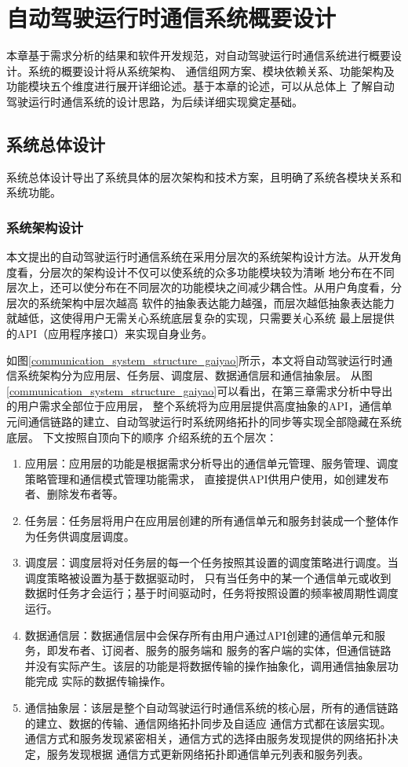 \chapter{自动驾驶运行时通信系统概要设计}
本章基于需求分析的结果和软件开发规范，对自动驾驶运行时通信系统进行概要设计。系统的概要设计将从系统架构、
通信组网方案、模块依赖关系、功能架构及功能模块五个维度进行展开详细论述。基于本章的论述，可以从总体上
了解自动驾驶运行时通信系统的设计思路，为后续详细实现奠定基础。

\section{系统总体设计}
系统总体设计导出了系统具体的层次架构和技术方案，且明确了系统各模块关系和系统功能。
\subsection{系统架构设计}
本文提出的自动驾驶运行时通信系统在采用分层次的系统架构设计方法。从开发角度看，分层次的架构设计不仅可以使系统的众多功能模块较为清晰
地分布在不同层次上，还可以使分布在不同层次的功能模块之间减少耦合性。从用户角度看，分层次的系统架构中层次越高
软件的抽象表达能力越强，而层次越低抽象表达能力就越低，这使得用户无需关心系统底层复杂的实现，只需要关心系统
最上层提供的API（应用程序接口）来实现自身业务。

如图\ref{communication_system_structure_gaiyao}所示，本文将自动驾驶运行时通信系统架构分为应用层、任务层、调度层、数据通信层和通信抽象层。
从图\ref{communication_system_structure_gaiyao}可以看出，在第三章需求分析中导出的用户需求全部位于应用层，
整个系统将为应用层提供高度抽象的API，通信单元间通信链路的建立、自动驾驶运行时系统网络拓扑的同步等实现全部隐藏在系统底层。
下文按照自顶向下的顺序
介绍系统的五个层次：
\begin{enumerate}
    \item 应用层：应用层的功能是根据需求分析导出的通信单元管理、服务管理、调度策略管理和通信模式管理功能需求，
    直接提供API供用户使用，如创建发布者、删除发布者等。
    \item 任务层：任务层将用户在应用层创建的所有通信单元和服务封装成一个整体作为任务供调度层调度。
    \item 调度层：调度层将对任务层的每一个任务按照其设置的调度策略进行调度。当调度策略被设置为基于数据驱动时，
    只有当任务中的某一个通信单元或收到数据时任务才会运行；基于时间驱动时，任务将按照设置的频率被周期性调度运行。
    \item 数据通信层：数据通信层中会保存所有由用户通过API创建的通信单元和服务，即发布者、订阅者、服务的服务端和
    服务的客户端的实体，但通信链路并没有实际产生。该层的功能是将数据传输的操作抽象化，调用通信抽象层功能完成
    实际的数据传输操作。
    \item 通信抽象层：该层是整个自动驾驶运行时通信系统的核心层，所有的通信链路的建立、数据的传输、通信网络拓扑同步及自适应
    通信方式都在该层实现。通信方式和服务发现紧密相关，通信方式的选择由服务发现提供的网络拓扑决定，服务发现根据
    通信方式更新网络拓扑即通信单元列表和服务列表。
\end{enumerate}

